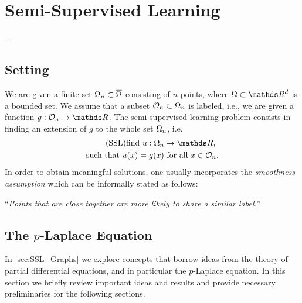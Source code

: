 \chapter{Semi-Supervised Learning}\label{ch:SSL}

-
-
%
\section{Setting}
We are given a finite set $\Omega_n\subset \overline{\Omega}$ consisting of $n$ points, where $\domain\subset\R^d$ 
is a bounded set. We assume that a subset $\mathcal{O}_n \subset \Omega_n$ is labeled, i.e., we are given a function
$g:\conset_n\to\R$. The semi-supervised learning problem consists in finding an extension of $g$ to the whole set $\Omega_n$,
i.e.
%
\begin{gather}\label{eq:SSL}
\begin{gathered}\tag{SSL}
\text{find } u:\domain_n\to\R,\\
\text{such that } u(x) = g(x) \text{ for all } x\in\conset_n.
\end{gathered}
\end{gather}
%
In order to obtain meaningful solutions, one usually incorporates the \emph{smoothness assumption} \cite{} which can be informally stated as follows:
%
\begin{center}
\enquote{\textit{Points that are close together are more likely to share a similar label.}}
\end{center}
%
%
%
\section{The $p$-Laplace Equation}
%
In \cref{sec:SSL_Graphs} we explore concepts that borrow ideas from the theory of partial differential equations, and
in particular the $p$-Laplace equation. In this section we briefly review important ideas and results and provide 
necessary preliminaries for the following sections.
%

